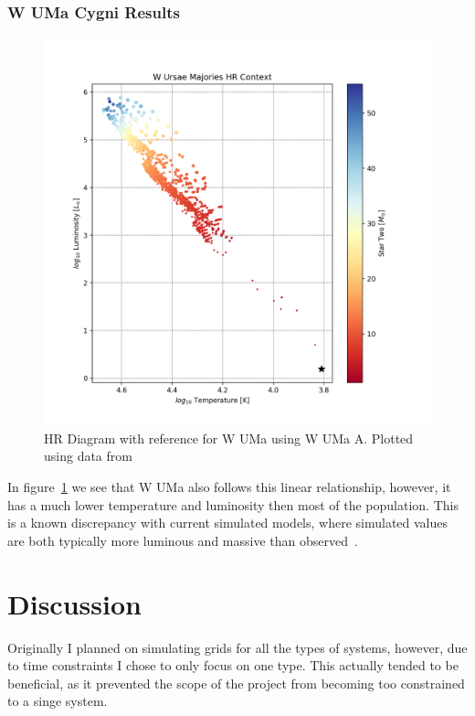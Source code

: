 \documentclass[12pt, a4paper]{article}
\begin{document}
        \subsubsection{W UMa Cygni Results}
            \begin{figure}[H]
                \centering
                \includegraphics[scale = .6]{figs/GeneratedFigs/W_UMa/WUMaHRDiagram.png}
                \caption{HR Diagram with reference for W UMa using W UMa A. Plotted using data from}
                \label{WUMaResults}
            \end{figure}

            In figure~\ref{WUMaResults} we see that W UMa also follows this linear relationship, however, it has a much lower temperature and luminosity then most of the population. This is a known discrepancy with current simulated models, where simulated values are both typically more luminous and massive than observed~\parencite{Fabry_2025}.

\section{Discussion}   
    Originally I planned on simulating grids for all the types of systems, however, due to time constraints I chose to only focus on one type. This actually tended to be beneficial, as it prevented the scope of the project from becoming too constrained to a singe system. 
\end{document}
